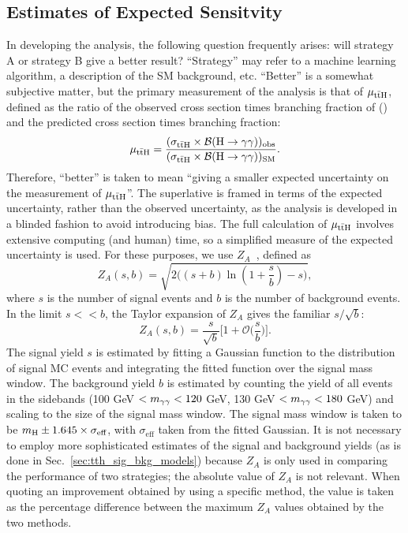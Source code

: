 \subsection{Estimates of Expected Sensitvity} \label{sec:tth_za}
In developing the \ttH analysis, the following question frequently arises: will strategy A or strategy B give a better result?
``Strategy'' may refer to a machine learning algorithm, a description of the SM background, etc.
``Better'' is a somewhat subjective matter, but the primary measurement of the \ttH analysis is that of $\mu_{\mathrm{t\bar{t}H}}$, defined as the ratio of the observed cross section times branching fraction of \ttH (\Hgg) and the predicted cross section times branching fraction:
\begin{equation}
    \mu_{\mathrm{t\bar{t}H}} = \frac{(\sigma_{\mathrm{t\bar{t}H}} \times \mathcal B (\mathrm{H\to\gamma\gamma}))_{\text{obs}}}{(\sigma_{\mathrm{t\bar{t}H}} \times \mathcal B (\mathrm{H\to\gamma\gamma}))_{\text{SM}}}.
\end{equation}
Therefore, ``better'' is taken to mean ``giving a smaller expected uncertainty on the measurement of $\mu_{\mathrm{t\bar{t}H}}$''.
The superlative is framed in terms of the expected uncertainty, rather than the observed uncertainty, as the analysis is developed in a blinded fashion to avoid introducing bias.
The full calculation of $\mu_{\mathrm{t\bar{t}H}}$ involves extensive computing (and human) time, so a simplified measure of the expected uncertainty is used.
For these purposes, we use $Z_A$~\cite{cowan_za}, defined as
\begin{equation}
    Z_A(s,b) = \sqrt{2 \bigg((s+b)\ln(1 + \frac{s}{b})-s\bigg)},
\end{equation}
where $s$ is the number of signal events and $b$ is the number of background events.
In the limit $s<<b$, the Taylor expansion of $Z_A$ gives the familiar $s/\sqrt{b}$:
\begin{equation}
    Z_A(s,b) = \frac{s}{\sqrt{b}}\bigg[1 + \mathcal O \bigg(\frac{s}{b}\bigg) \Bigg].
\end{equation}
The signal yield $s$ is estimated by fitting a Gaussian function to the \mgg distribution of signal MC events and integrating the fitted function over the signal mass window.
The background yield $b$ is estimated by counting the yield of all events in the \mgg sidebands (100 GeV $< m_{\gamma\gamma} < 120$ GeV, 130 GeV $< m_{\gamma\gamma} < 180$ GeV) and scaling to the size of the signal mass window.
The signal mass window is taken to be $m_{\mathrm{H}} \pm 1.645 \times \sigma_{\text{eff}}$, with $\sigma_{\text{eff}}$ taken from the fitted Gaussian.
It is not necessary to employ more sophisticated estimates of the signal and background yields (as is done in Sec.~\ref{sec:tth_sig_bkg_models}) because $Z_A$ is only used in comparing the performance of two strategies; the absolute value of $Z_A$ is not relevant.
When quoting an improvement obtained by using a specific method, the value is taken as the percentage difference between the maximum $Z_A$ values obtained by the two methods.
